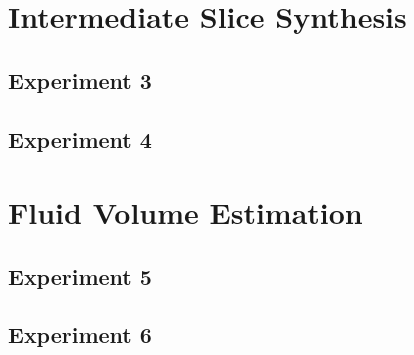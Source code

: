 \section{Intermediate Slice Synthesis}\label{IntermediateSliceSynthesis}

\subsection{Experiment 3}

\subsection{Experiment 4}

\section{Fluid Volume Estimation}\label{FluidVolumeEstimation}

\subsection{Experiment 5}

\subsection{Experiment 6}